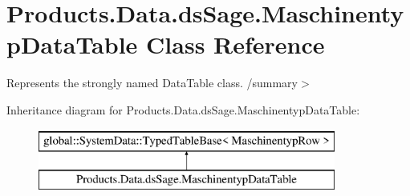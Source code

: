 \hypertarget{class_products_1_1_data_1_1ds_sage_1_1_maschinentyp_data_table}{}\section{Products.\+Data.\+ds\+Sage.\+Maschinentyp\+Data\+Table Class Reference}
\label{class_products_1_1_data_1_1ds_sage_1_1_maschinentyp_data_table}


Represents the strongly named Data\+Table class. /summary$>$  


Inheritance diagram for Products.\+Data.\+ds\+Sage.\+Maschinentyp\+Data\+Table\+:\begin{figure}[H]
\begin{center}
\leavevmode
\includegraphics[height=2.000000cm]{class_products_1_1_data_1_1ds_sage_1_1_maschinentyp_data_table}
\end{center}
\end{figure}
